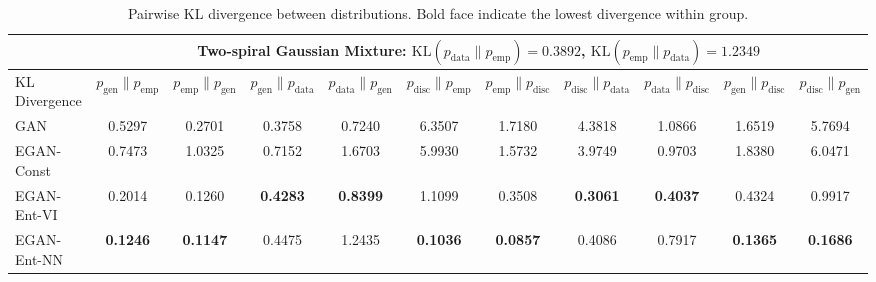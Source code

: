 \documentclass[a4paper]{article}
\newcommand{\pd}{p_\text{data}}
\newcommand{\pg}{p_\text{gen}}
\begin{document}
\begin{table}[h]
\begin{tabular}{l|cccc|cccc|cc}
\bottomrule\toprule
&\multicolumn{10}{c}{Two-spiral Gaussian Mixture: \quad $\text{KL}(\pd \| p_\text{emp}) = 0.3892$, \quad $\text{KL}(p_\text{emp} \| \pd) = 1.2349$} \\
\midrule
KL Divergence & $\pg \| p_\text{emp}$ & $p_\text{emp} \| \pg$ & $\pg \| \pd$ & $\pd \| \pg$ & $p_\text{disc} \| p_\text{emp}$ & $p_\text{emp} \| p_\text{disc}$ & $p_\text{disc} \| \pd$ & $\pd \| p_\text{disc}$ & $\pg \| p_\text{disc}$ & $p_\text{disc} \| \pg$ \\
\midrule
GAN         & 0.5297 & 0.2701 & 0.3758 & 0.7240 & 6.3507 & 1.7180 & 4.3818 & 1.0866 & 1.6519 & 5.7694 \\
EGAN-Const  & 0.7473 & 1.0325 & 0.7152 & 1.6703 & 5.9930 & 1.5732 & 3.9749 & 0.9703 & 1.8380 & 6.0471 \\
EGAN-Ent-VI & 0.2014 & 0.1260 & \textbf{0.4283} & \textbf{0.8399} & 1.1099 & 0.3508 & \textbf{0.3061} & \textbf{0.4037} & 0.4324 & 0.9917 \\
EGAN-Ent-NN &\textbf{ 0.1246} & \textbf{0.1147} & 0.4475 & 1.2435 & \textbf{0.1036} & \textbf{0.0857} & 0.4086 & 0.7917 & \textbf{0.1365} & \textbf{0.1686} \\
\bottomrule
\end{tabular}
\caption{Pairwise KL divergence between distributions. Bold face indicate the lowest divergence within group.}
\label{tab:kl}
\end{table}
\setlength\tabcolsep{6pt}
\end{document}
